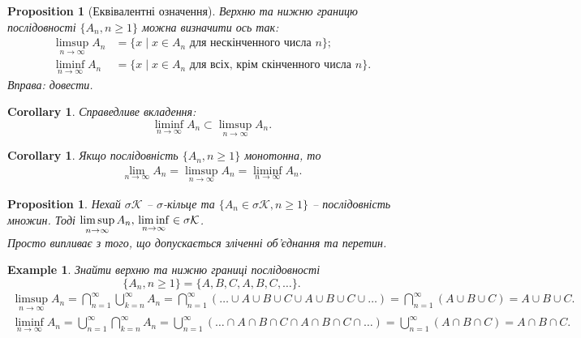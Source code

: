 \documentclass[a4paper, 10pt]{article}
\theoremstyle{theoremdd}
\newtheorem{example}[theorem]{Example}
\newtheorem{proposition}[theorem]{Proposition}
\newtheorem{corollary}[theorem]{Corollary}
\begin{document}
\begin{proposition}[Еквівалентні означення]
Верхню та нижню границю послідовності $\{A_n, n \geq 1\}$ можна визначити ось так:
\begin{align*}
\limsup_{n \to \infty} A_n & = \{x \mid x \in A_n \text{ для нескінченного числа $n$}\}; \\
\liminf_{n \to \infty} A_n & = \{x \mid x \in A_n \text{ для всіх, крім скінченного числа $n$}\}.
\end{align*}
\textit{Вправа: довести.}
\end{proposition}

\begin{corollary}
Справедливе вкладення:
\begin{equation*}
\liminf_{n \to \infty} A_n \subset \limsup_{n \to \infty} A_n.
\end{equation*}
\end{corollary}

\begin{corollary}
Якщо послідовність $\{A_n,n \geq 1\}$ монотонна, то
\begin{align*}
\lim_{n \to \infty} A_n = \limsup_{n \to \infty} A_n = \liminf_{n \to \infty} A_n.
\end{align*}
\end{corollary}

\begin{proposition}
Нехай $\sigma \mathcal{K}$ -- $\sigma$-кільце та $\{A_n \in \sigma \mathcal{K}, n \geq 1\}$ -- послідовність множин. Тоді $\displaystyle \limsup_{n \to \infty} A_n,\\ \liminf_{n \to \infty} \in \sigma \mathcal{K}$.\\
\textit{Просто випливає з того, що допускається зліченні об'єднання та перетин.}
\end{proposition}

\begin{example}
Знайти верхню та нижню границі послідовності \[
\{A_n, n \geq 1\} = \{A,B,C,A,B,C,\dots\}.
\]
\begin{align*}
\limsup_{n \to \infty} A_n = \bigcap_{n=1}^\infty \bigcup_{k=n}^\infty A_n = \bigcap_{n=1}^\infty ( \dots \cup A \cup B \cup C \cup A \cup B \cup C \cup \dots) = \bigcap_{n=1}^\infty (A \cup B \cup C) = A \cup B \cup C. \\
\liminf_{n \to \infty} A_n = \bigcup_{n=1}^\infty \bigcap_{k=n}^\infty A_n = \bigcup_{n=1}^\infty (\dots \cap A \cap B \cap C \cap A \cap B \cap C \cap \dots) = \bigcup_{n=1}^\infty (A \cap B \cap C) = A \cap B \cap C.
\end{align*}
\end{example}
\end{document}
